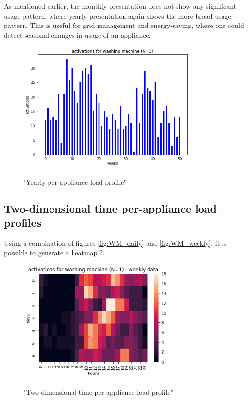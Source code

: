 As mentioned earlier, the monthly presentation does not show any significant usage pattern,
where yearly presentation again shows the more broad usage pattern.
This is useful for grid management and energy-saving,
where one could detect seasonal changes in usage of an appliance. 

\begin{figure}[H]
	\centering
	\caption{"Yearly per-appliance load profile"}
	\includegraphics[width=0.8\textwidth]{../Figures/LPS/WM_yearly.png}
	\label{fig:WM_yearly}
\end{figure}

\subsection{Two-dimensional time per-appliance load profiles}

Using a combination of figures \ref{fig:WM_daily} and \ref{fig:WM_weekly},
it is possible to generate a heatmap \ref{fig:wm_hm_weekly}.

\begin{figure}[H]
	\centering
	\caption{"Two-dimensional time per-appliance load profile"}
	\includegraphics[width=0.7\textwidth]{../Figures/LPS/wm_hm_weekly.png}
	\label{fig:wm_hm_weekly}
\end{figure}

